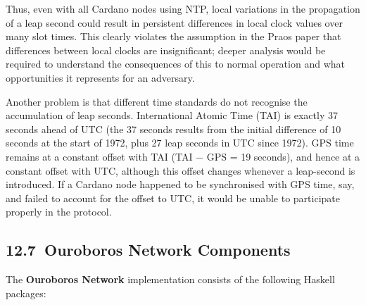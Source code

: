 \documentclass[]{article}
\begin{document}
Thus, even with all Cardano nodes using NTP, local variations in the
propagation of a leap second could result in persistent differences in
local clock values over many slot times. This clearly violates the
assumption in the Praos paper that differences between local clocks are
insignificant; deeper analysis would be required to understand the
consequences of this to normal operation and what opportunities it
represents for an adversary.

Another problem is that different time standards do not recognise the
accumulation of leap seconds. International Atomic Time (TAI) is exactly
37 seconds ahead of UTC (the 37 seconds results from the initial
difference of 10 seconds at the start of 1972, plus 27 leap seconds in
UTC since 1972). GPS time remains at a constant offset with TAI (TAI −
GPS = 19 seconds), and hence at a constant offset with UTC, although
this offset changes whenever a leap-second is introduced. If a Cardano
node happened to be synchronised with GPS time, say, and failed to
account for the offset to UTC, it would be unable to participate
properly in the protocol.

\hypertarget{ouroboros-network-components}{%
\subsection{​12.7​~Ouroboros Network
Components}\label{ouroboros-network-components}}

The \textbf{Ouroboros Network} implementation consists of the following
Haskell packages:
\end{document}
